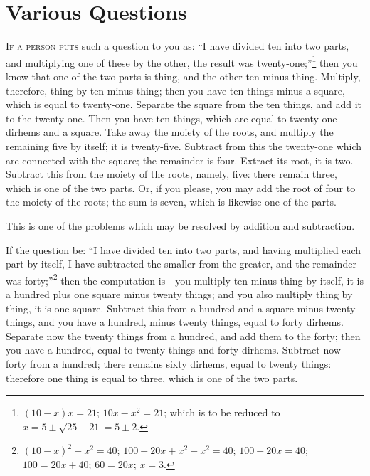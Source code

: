 \clearpage


\section*{Various Questions}

\lettrine{I}{f a person puts} such a question to you as: ``I have divided ten into two parts, and multiplying one of these by the other, the result was twenty-one;''\footnote{$(10-x)x = 21$; $10x - x^2 = 21$; which is to be reduced to $x = 5 \pm \sqrt{25-21} = 5 \pm 2$.} then you know that one of the two parts is thing, and the other ten minus thing. Multiply, therefore, thing by ten minus thing; then you have ten things minus a square, which is equal to twenty-one. Separate the square from the ten things, and add it to the twenty-one. Then you have ten things, which are equal to twenty-one dirhems and a square. Take away the moiety of the roots, and multiply the remaining five by itself; it is twenty-five. Subtract from this the twenty-one which are connected with the square; the remainder is four. Extract its root, it is two. Subtract this from the moiety of the roots, namely, five: there remain three, which is one of the two parts. Or, if you please, you may add the root of four to the moiety of the roots; the sum is seven, which is likewise one of the parts.

This is one of the problems which may be resolved by addition and subtraction.

If the question be: ``I have divided ten into two parts, and having multiplied each part by itself, I have subtracted the smaller from the greater, and the remainder was forty;''\footnote{$(10-x)^2 - x^2 = 40$; $100 - 20x + x^2 - x^2 = 40$; $100 - 20x = 40$; $100 = 20x + 40$; $60 = 20x$; $x = 3$.} then the computation is---you multiply ten minus thing by itself, it is a hundred plus one square minus twenty things; and you also multiply thing by thing, it is one square. Subtract this from a hundred and a square minus twenty things, and you have a hundred, minus twenty things, equal to forty dirhems. Separate now the twenty things from a hundred, and add them to the forty; then you have a hundred, equal to twenty things and forty dirhems. Subtract now forty from a hundred; there remains sixty dirhems, equal to twenty things: therefore one thing is equal to three, which is one of the two parts.

